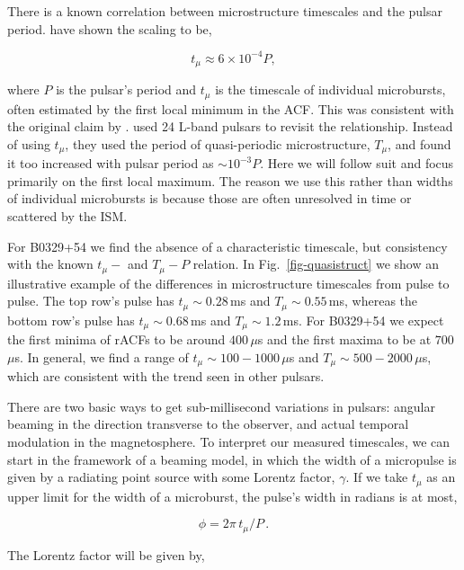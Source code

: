 There is a known correlation between microstructure 
timescales and the pulsar period. 
\citet{2002MNRAS.334..523K} have shown the scaling to be,

\begin{equation}
t_\mu \approx 6\times10^{-4} P,
\end{equation}

\noindent where $P$ is the pulsar's period and 
$t_\mu$ is the timescale of individual microbursts, 
often estimated by the first local minimum in the ACF. 
This was consistent with the original claim by 
\citet{1979ApJ...233..981C}. 
\citet{2015ApJ...806..236M} used 24 L-band pulsars 
to revisit the relationship. Instead of using $t_\mu$, 
they used the period of quasi-periodic microstructure, 
$T_\mu$, and found it too increased 
with pulsar period as $\sim 10^{-3} P$. Here we will follow suit and 
focus primarily on the first local maximum. The reason we use
this rather than widths of individual microbursts 
is because those are often unresolved in time or scattered 
by the ISM. 

For B0329+54 we find the absence of a characteristic 
timescale, but consistency with 
the known $t_\mu-$ and $T_\mu-P$ relation. 
In Fig.~\ref{fig-quasistruct} we show 
an illustrative example of the differences in 
microstructure timescales from pulse to pulse. The 
top row's pulse has $t_\mu \sim 0.28$\,ms and 
$T_\mu \sim 0.55$\,ms, whereas the bottom row's pulse 
has $t_\mu \sim 0.68$\,ms and $T_\mu \sim 1.2$\,ms.
For B0329+54 we expect the first minima of rACFs
to be around $400$\,$\mu$s and the first maxima 
to be at $700$\,$\mu$s. In general, we find a range of 
$t_\mu \sim 100-1000$\,$\mu$s and 
$T_\mu \sim 500-2000$\,$\mu$s, which are consistent 
with the trend seen in other pulsars. 

There are two basic ways to get sub-millisecond 
variations in pulsars: angular beaming in the 
direction transverse to the observer, and actual temporal 
modulation in the magnetosphere.  
To interpret our measured timescales, we can start 
in the framework of a beaming model, in which 
the width of a micropulse is given by a 
radiating point source with some Lorentz factor, $\gamma$.
If we take $t_\mu$ as an upper limit for the 
width of a microburst, the pulse's width in radians is 
at most,

\begin{equation}
\phi = 2 \pi \, t_\mu / P\,.
\end{equation}

\noindent The Lorentz factor will be given by,

